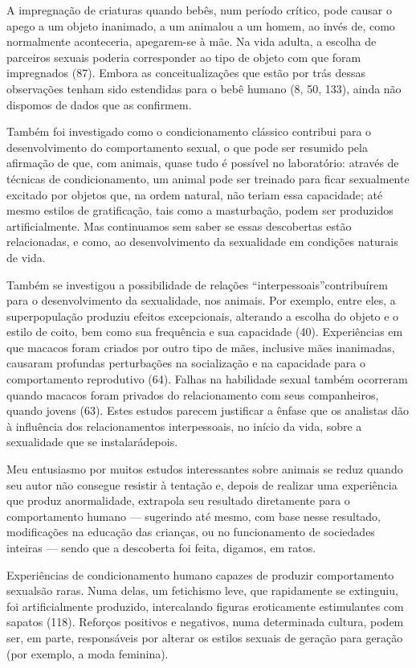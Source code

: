  A impregnação\idxestam{} de criaturas quando bebês, num período crítico, pode
causar o apego a um objeto inanimado, a um animal\idxanim[|(] ou a um homem, ao
invés de, como normalmente aconteceria, apegarem-se à mãe. Na vida
adulta, a escolha de parceiros sexuais poderia corresponder ao tipo de
objeto com que foram impregnados (87). Embora as conceitualizações que
estão por trás dessas observações tenham sido estendidas para o bebê
humano (8, 50, 133), ainda não dispomos de dados que as confirmem.

 Também foi investigado como o condicionamento clássico contribui para o
desenvolvimento do comportamento sexual, o que pode ser resumido pela
afirmação de que, com animais, quase tudo é possível no laboratório:
através de técnicas de condicionamento, um animal pode ser treinado
para ficar sexualmente excitado por objetos que, na ordem natural, não
teriam essa capacidade; até mesmo estilos de gratificação, tais como a
masturbação,\idxmastur{} podem ser produzidos artificialmente. Mas continuamos sem
saber se essas descobertas estão relacionadas, e como, ao
desenvolvimento da sexualidade em condições naturais de vida.

Também se investigou a possibilidade de relações ``interpessoais''\idxinter[|(]
contribuírem para o desenvolvimento da sexualidade, nos animais. Por
exemplo, entre eles, a superpopulação produziu efeitos excepcionais,
alterando a escolha do objeto e o estilo de coito, bem como sua
frequência e sua capacidade (40). Experiências em que macacos foram
criados por outro tipo de mães, inclusive mães inanimadas, causaram
profundas perturbações na socialização e na capacidade para o
comportamento reprodutivo (64). Falhas na habilidade sexual também
ocorreram quando macacos foram privados do relacionamento com seus
companheiros, quando jovens (63). Estes estudos parecem justificar a
ênfase que os analistas dão à influência dos relacionamentos
interpessoais, no início da vida, sobre a sexualidade que se instalará\idxinter[|)]
depois.

 Meu entusiasmo por muitos estudos interessantes sobre animais se reduz
quando seu autor não consegue resistir à tentação e, depois de realizar
uma experiência que produz anormalidade, extrapola seu resultado
diretamente para o comportamento humano --- sugerindo até mesmo, com
base nesse resultado, modificações na educação das crianças, ou no
funcionamento de sociedades inteiras --- sendo que a descoberta foi
feita, digamos, em ratos.\idxanim[|)]

 Experiências de condicionamento humano capazes de produzir
comportamento sexual\idxaberr[|)] são raras. Numa delas, um fetichismo\idxfetic{} leve, que
rapidamente se extinguiu, foi artificialmente produzido, intercalando
figuras eroticamente estimulantes com sapatos (118). Reforços positivos
e negativos, numa determinada cultura, podem ser, em parte,
responsáveis por alterar os estilos sexuais de geração para geração
(por exemplo, a moda feminina).

